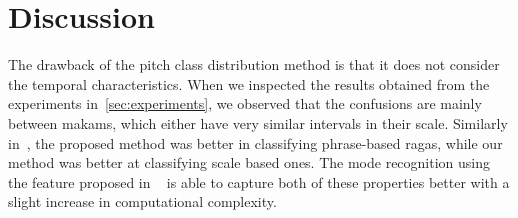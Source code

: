 \documentclass{sig-alternate}
\begin{document}
% 
% 
% 

\section{Discussion}\label{sec:discussion}

The drawback of the pitch class distribution method is that it does not consider the temporal characteristics. When we inspected the results obtained from the experiments in~\ref{sec:experiments}, we observed that the confusions are mainly between makams, which either have very similar intervals in their scale. Similarly in~\cite{gulati_network}, the proposed method was better in classifying phrase-based ragas, while our method was better at classifying scale based ones. The mode recognition using the feature proposed in ~\cite{hindustani_carnatic_experiments_anon} is able to capture both of these properties better with a slight increase in computational complexity.
\end{document}
